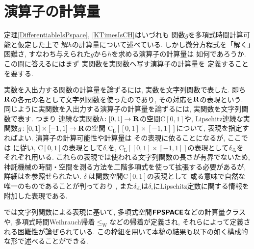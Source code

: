\section{演算子の計算量}

定理\ref{DifferentiableIsPspace}, 
\ref{KTimesIsCH}はいづれも
関数$g$を多項式時間計算可能と仮定した上で
解$h$の計算量について述べている. 
しかし微分方程式を「解く」困難さ, 
すなわち与えられた$g$から$h$を求める演算子の計算量は
如何であろうか. 
この問に答えるにはまず
実関数を実関数へ写す演算子の計算量を
定義することを要する. 

\newcommand{\OpIVP}{\mathit{ODE}}
\newcommand{\deltabox}{\delta _\square}
\newcommand{\deltaboxLip}{\delta _{\square \mathrm L}}
\newcommand{\classtwofont}[1]{\text{\bfseries \sffamily \upshape #1}}
\newcommand{\classFPSPACEtwo}{\classtwofont{FPSPACE}}
\newcommand{\classCHtwo}{\classtwofont{CH}}
\newcommand{\redW}{\leq _{\mathrm W}}
\newcommand{\classLip}{\mathrm C _{\mathrm L}}
\newcommand{\classC}{\mathrm C}

実数を入出力する関数の計算量を論ずるには, 
実数を文字列関数で表した. 
即ち$\mathbf R$の各元の名として文字列関数を使ったのであり, 
その対応を$\mathbf R$の表現という. 
同じように実関数を入出力する演算子の計算量を論ずるには, 
実関数を文字列関数で表す. 
つまり
連続な実関数$h \colon [0,1] \to \mathbf R$の空間$\classC [0, 1]$や, 
Lipschitz連続な実関数$g \colon [0, 1] \times [-1, 1] \to \mathbf R$の空間
$\classLip [[0, 1] \times [-1, 1]]$について, 
表現を指定すればよい. 
演算子の計算可能性や計算量は
その表現に依ることになるが, 
ここでは
\cite{kawamura2010operators}に従い, 
$\classC [0, 1]$の表現として$\deltabox$を, 
$\classLip [[0, 1] \times [-1, 1]]$の表現として$\deltaboxLip$を
それぞれ用いる. 
これらの表現では使われる文字列関数の長さが有界でないため, 
神託機械の時間・空間を測る方法を二階多項式を使って拡張する必要があるが, 
詳細は\cite{kawamura2010operators}を参照せられたい. 
$\deltabox$は関数空間$\classC [0, 1]$の表現として
或る意味で自然な唯一のものであることが判っており
\cite{kawamura11:_funct_space_repres_and_polyn_time_comput}, 
また$\deltaboxLip$は$\deltabox$にLipschitz定数に関する情報を附加した表現である. 

\cite{kawamura2010operators}では文字列関数による表現に基いて, 
多項式空間$\classFPSPACEtwo$などの計算量クラスや, 
多項式時間Weihrauch帰着$\redW$などの帰着が定義され, 
それらによって定義される困難性が論ぜられている. 
この枠組を用いて本稿の結果も以下の如く構成的な形で述べることができる. 

